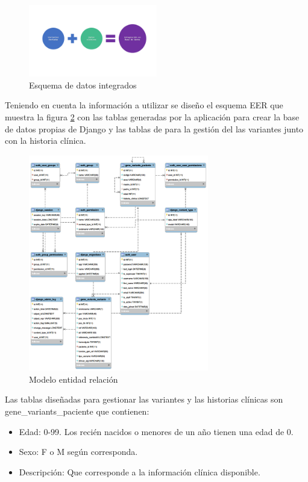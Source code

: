 \begin{figure}[h!] 
	\centering
	\includegraphics[width=0.5\textwidth]{Kap3/flujo2}
	\caption{Esquema de datos integrados} 
	\label{fig:flujo2}
\end{figure}

Teniendo en cuenta la información a utilizar se diseño el esquema EER  que muestra la figura \ref{fig:t} con las tablas generadas por la aplicación para crear la base de datos propias de Django y las tablas de para la gestión del las variantes junto con la historia clínica.

\begin{figure}[H]
	\centering
	\includegraphics[width=0.7\textwidth]{Kap3/modeloEER}
	\caption{Modelo entidad relación} \label{fig:t}
\end{figure}

Las tablas diseñadas para gestionar las variantes y las historias clínicas son gene\_variants\_paciente que contienen:

\begin{itemize}
	\item Edad: 0-99. Los recién nacidos  o menores de un año tienen una edad de 0.
	\item Sexo: F o M según corresponda.
	\item Descripción: Que corresponde a la información clínica disponible.
\end{itemize} 



